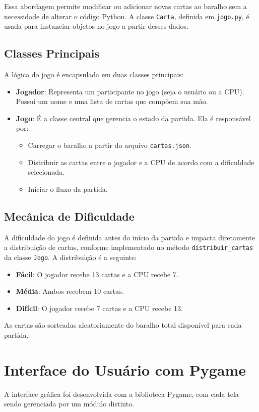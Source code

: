 \documentclass[a4paper, twocolumn]{article}
\begin{document}
Essa abordagem permite modificar ou adicionar novas cartas ao baralho sem a necessidade de alterar o código Python. A classe \texttt{Carta}, definida em \texttt{jogo.py}, é usada para instanciar objetos no jogo a partir desses dados.

\subsection{Classes Principais}
A lógica do jogo é encapsulada em duas classes principais:

\begin{itemize}
    \item \textbf{Jogador}: Representa um participante no jogo (seja o usuário ou a CPU). Possui um nome e uma lista de cartas que compõem sua mão.
    \item \textbf{Jogo}: É a classe central que gerencia o estado da partida. Ela é responsável por:
    \begin{itemize}
        \item Carregar o baralho a partir do arquivo \texttt{cartas.json}.
        \item Distribuir as cartas entre o jogador e a CPU de acordo com a dificuldade selecionada.
        \item Iniciar o fluxo da partida.
    \end{itemize}
\end{itemize}

\subsection{Mecânica de Dificuldade}
A dificuldade do jogo é definida antes do início da partida e impacta diretamente a distribuição de cartas, conforme implementado no método \texttt{distribuir\_cartas} da classe \texttt{Jogo}. A distribuição é a seguinte:

\begin{itemize}
    \item \textbf{Fácil}: O jogador recebe 13 cartas e a CPU recebe 7.
    \item \textbf{Média}: Ambos recebem 10 cartas.
    \item \textbf{Difícil}: O jogador recebe 7 cartas e a CPU recebe 13.
\end{itemize}
As cartas são sorteadas aleatoriamente do baralho total disponível para cada partida.

\section{Interface do Usuário com Pygame}
A interface gráfica foi desenvolvida com a biblioteca Pygame, com cada tela sendo gerenciada por um módulo distinto.
\end{document}
